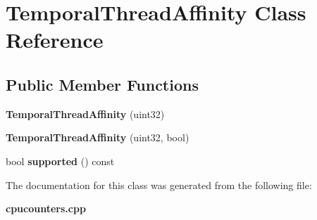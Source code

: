 \section{Temporal\+Thread\+Affinity Class Reference}
\label{classTemporalThreadAffinity}
\subsection*{Public Member Functions}
\begin{DoxyCompactItemize}
\item 
\mbox{\label{classTemporalThreadAffinity_adc237efcc45938f0c188e705b2ed226e}} 
{\bfseries Temporal\+Thread\+Affinity} (uint32)
\item 
\mbox{\label{classTemporalThreadAffinity_a8083ef5dd965f871f42ae5ea4226d242}} 
{\bfseries Temporal\+Thread\+Affinity} (uint32, bool)
\item 
\mbox{\label{classTemporalThreadAffinity_aae90a72724e0fbb83b3e9607679d27ca}} 
bool {\bfseries supported} () const
\end{DoxyCompactItemize}


The documentation for this class was generated from the following file\+:\begin{DoxyCompactItemize}
\item 
\textbf{ cpucounters.\+cpp}\end{DoxyCompactItemize}
